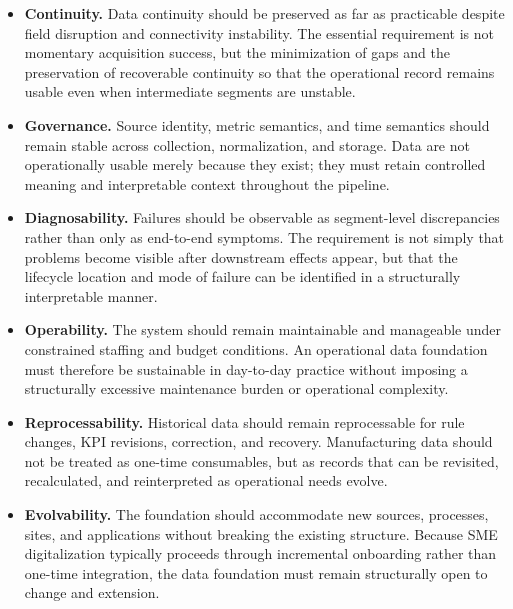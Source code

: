 \documentclass[systems,article,submit,pdftex,moreauthors]{Definitions/mdpi}
\begin{document}
\begin{itemize}
    \item[\textbf{R1.}] \textbf{Continuity.} Data continuity should be preserved as far as practicable despite field disruption and connectivity instability. The essential requirement is not momentary acquisition success, but the minimization of gaps and the preservation of recoverable continuity so that the operational record remains usable even when intermediate segments are unstable.

    \item[\textbf{R2.}] \textbf{Governance.} Source identity, metric semantics, and time semantics should remain stable across collection, normalization, and storage. Data are not operationally usable merely because they exist; they must retain controlled meaning and interpretable context throughout the pipeline.

    \item[\textbf{R3.}] \textbf{Diagnosability.} Failures should be observable as segment-level discrepancies rather than only as end-to-end symptoms. The requirement is not simply that problems become visible after downstream effects appear, but that the lifecycle location and mode of failure can be identified in a structurally interpretable manner.

    \item[\textbf{R4.}] \textbf{Operability.} The system should remain maintainable and manageable under constrained staffing and budget conditions. An operational data foundation must therefore be sustainable in day-to-day practice without imposing a structurally excessive maintenance burden or operational complexity.

    \item[\textbf{R5.}] \textbf{Reprocessability.} Historical data should remain reprocessable for rule changes, KPI revisions, correction, and recovery. Manufacturing data should not be treated as one-time consumables, but as records that can be revisited, recalculated, and reinterpreted as operational needs evolve.

    \item[\textbf{R6.}] \textbf{Evolvability.} The foundation should accommodate new sources, processes, sites, and applications without breaking the existing structure. Because SME digitalization typically proceeds through incremental onboarding rather than one-time integration, the data foundation must remain structurally open to change and extension.
\end{itemize}
\end{document}
